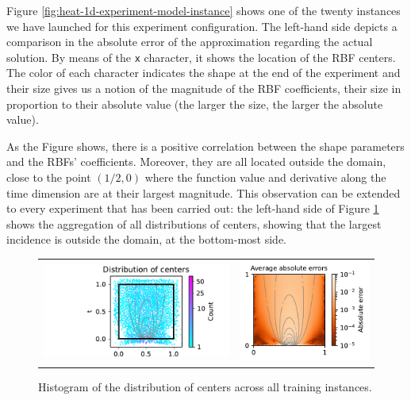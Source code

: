 \documentclass[12pt]{report} %
\begin{document}
Figure \ref{fig:heat-1d-experiment-model-instance} shows one of the twenty instances we have launched for this experiment configuration. The left-hand side depicts a comparison in the absolute error of the approximation regarding the actual solution. By means of the \texttt{x} character, it shows the location of the RBF centers. The color of each character indicates the shape at the end of the experiment and their size gives us a notion of the magnitude of the RBF coefficients, their size in proportion to their absolute value (the larger the size, the larger the absolute value). 


As the Figure shows, there is a positive correlation between the shape parameters and the RBFs' coefficients. Moreover, they are all located outside the domain, close to the point $(1/2,0)$ where the function value and derivative along the time dimension are at their largest magnitude. This observation can be extended to every experiment that has been carried out: the left-hand side of Figure \ref{fig:heat-1d-centers-distribution} shows the aggregation of all distributions of centers, showing that the largest incidence is outside the domain, at the bottom-most side.

\begin{figure}\begin{tabular}{cc}
    \includegraphics[height=.3\textwidth]{imagenes/experiments/2d/heat_1d/new_graphics/circle_c900_heat_1d_gaussian_kernel.pdf}&
    \includegraphics[height=.33\textwidth]{imagenes/experiments/2d/heat_1d/new_graphics/avg_absolute_errors.pdf}
\end{tabular}
  \caption{Histogram of the distribution of centers across all training instances.}
  \label{fig:heat-1d-centers-distribution}
\end{figure}
\end{document}
